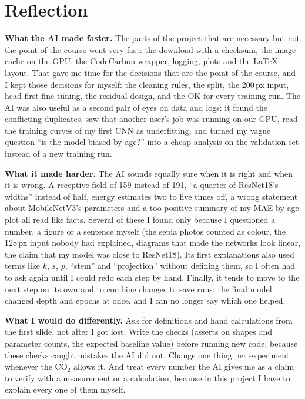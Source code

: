 \documentclass[10pt,a4paper]{article}
\newcommand{\cotwo}{CO$_2$}
\begin{document}
\section{Reflection}
\textbf{What the AI made faster.} The parts of the project that are necessary but not the point of the course went very fast: the download with a checksum, the image cache on the GPU, the CodeCarbon wrapper, logging, plots and the \LaTeX{} layout. That gave me time for the decisions that are the point of the course, and I kept those decisions for myself: the cleaning rules, the split, the 200\,px input, head-first fine-tuning, the residual design, and the OK for every training run. The AI was also useful as a second pair of eyes on data and logs: it found the conflicting duplicates, saw that another user's job was running on our GPU, read the training curves of my first CNN as underfitting, and turned my vague question ``is the model biased by age?'' into a cheap analysis on the validation set instead of a new training run.

\textbf{What it made harder.} The AI sounds equally sure when it is right and when it is wrong. A receptive field of 159 instead of 191, ``a quarter of ResNet18's widths'' instead of half, energy estimates two to five times off, a wrong statement about MobileNetV3's parameters and a too-positive summary of my MAE-by-age plot all read like facts. Several of these I found only because I questioned a number, a figure or a sentence myself (the sepia photos counted as colour, the 128\,px input nobody had explained, diagrams that made the networks look linear, the claim that my model was close to ResNet18). Its first explanations also used terms like $k$, $s$, $p$, ``stem'' and ``projection'' without defining them, so I often had to ask again until I could redo each step by hand. Finally, it tends to move to the next step on its own and to combine changes to save runs; the final model changed depth and epochs at once, and I can no longer say which one helped.

\textbf{What I would do differently.} Ask for definitions and hand calculations from the first slide, not after I got lost. Write the checks (asserts on shapes and parameter counts, the expected baseline value) before running new code, because these checks caught mistakes the AI did not. Change one thing per experiment whenever the \cotwo{} allows it. And treat every number the AI gives me as a claim to verify with a measurement or a calculation, because in this project I have to explain every one of them myself.
\end{document}
